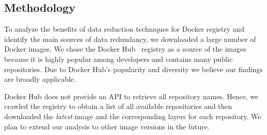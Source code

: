 \subsection{Methodology}
\label{sec:methodology}



To analyze the benefits of data reduction techniques for Docker registry and
identify the main sources of data redundancy, we downloaded a large number of
Docker images.
%
We chose the Docker Hub~\cite{docker-hub} registry as a source of the images
because it is highly popular among developers and contains many public
repositories.
%
Due to Docker Hub's popularity and diversity
we believe our findings are broadly applicable.

Docker Hub does not provide an API to retrieve all repository names.
Hence, we crawled the registry to obtain a list of all available repositories
and then downloaded the \emph{latest} image and the corresponding layers for
each repository.
%
%
%
We plan to extend our analysis to other image versions in the future.
%
%
